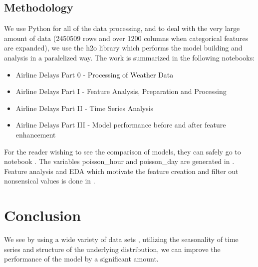 \documentclass[twocolumn,showpacs,%
  nofootinbib,aps,superscriptaddress,%
  eqsecnum,prd,notitlepage,showkeys,10pt]{revtex4-1}
\begin{document}
\subsection{Methodology}

We use Python for all of the data processing, and to deal with the very large amount of data (2450509 rows and over 1200 columns when categorical features are expanded), we use the h2o library which performs the model building and analysis in a paralelized way. The work is summarized
in the following notebooks:

\begin{itemize}
\item Airline Delays Part 0 - Processing of Weather Data  \cite{airline1}
\item Airline Delays Part I - Feature Analysis, Preparation and Processing \cite{airline2}
\item Airline Delays Part II - Time Series Analysis \cite{airline3}
\item Airline Delays Part III - Model performance before and after feature enhancement \cite{airline4}
\end{itemize}

For the reader wishing to see the comparison of models, they can safely go to notebook \cite{airline4}. The variables poisson\_hour and poisson\_day are generated in \cite{airline3}. Feature analysis and EDA
which motivate the feature creation and filter out nonsensical values is done in \cite{airline2}. 




\section{Conclusion}

We see by using a wide variety of data sets , utilizing the seasonality of time series and structure of the underlying distribution, we can improve the performance of the model by a significant amount.
\end{document}
